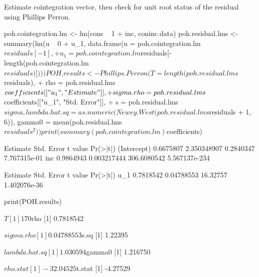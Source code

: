 \documentclass[a4paper]{article}
\renewcommand{\~}{\perispomeni}%
\begin{document}
Estimate cointegration vector, then check for unit root status of the residual using Phillips Perron.
\begin{Schunk}
\begin{Sinput}
 poh.cointegration.lm <- lm(cons ~ 1 + inc, coninc.data)
 poh.residual.lms <- summary(lm(u ~ 0 + u_1, data.frame(u = poh.cointegration.lm$residuals[-1], 
+     u_1 = poh.cointegration.lm$residuals[-length(poh.cointegration.lm$residuals)])))
 POH.results <- Phillips.Perron(T = length(poh.residual.lms$residuals), 
+     rho = poh.residual.lms$coefficients[["u_1", "Estimate"]], 
+     sigma.rho = poh.residual.lms$coefficients[["u_1", "Std. Error"]], 
+     s = poh.residual.lms$sigma, lambda.hat.sq = as.numeric(Newey.West(poh.residual.lms$residuals %
+         1, 6)), gamma0 = mean(poh.residual.lms$residuals^2))
 print(summary(poh.cointegration.lm)$coefficients)
\end{Sinput}
\begin{Soutput}
             Estimate  Std. Error     t value      Pr(>|t|)
(Intercept) 0.6675807 2.350348907   0.2840347  7.767315e-01
inc         0.9864943 0.003217444 306.6080542 5.567137e-234
\end{Soutput}
\begin{Soutput}
     Estimate Std. Error  t value     Pr(>|t|)
u_1 0.7818542 0.04788553 16.32757 1.402076e-36
\end{Soutput}
\begin{Sinput}
 print(POH.results)
\end{Sinput}
\begin{Soutput}
$T
[1] 170

$rho
[1] 0.7818542

$sigma.rho
[1] 0.04788553

$s.sq
[1] 1.22395

$lambda.hat.sq
[1] 1.030594

$gamma0
[1] 1.216750

$rho.stat
[1] -32.04525

$t.stat
[1] -4.27529
\end{Soutput}
\end{Schunk}
\end{document}

